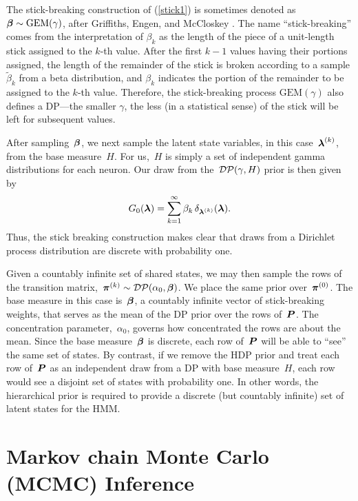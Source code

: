 The stick-breaking construction of (\ref{stick1}) is sometimes denoted
as~${\boldsymbol{\beta} \sim \mathrm{GEM}(\gamma)}$, after Griffiths, Engen, and
McCloskey \citep{Ewens90}.  The name ``stick-breaking'' comes from the
interpretation of $\beta_k$ as the length of the piece of a
unit-length stick assigned to the $k$-th value.  After the first $k-1$
values having their portions assigned, the length of the remainder of
the stick is broken according to a sample $\widetilde{\beta}_k$ from a beta
distribution, and ${\beta}_k$ indicates the portion of the
remainder to be assigned to the $k$-th value. Therefore, the
stick-breaking process $\mathrm{GEM}(\gamma)$ also defines a DP---the
smaller $\gamma$, the less (in a statistical sense) of the stick will
be left for subsequent values.

After sampling~$\boldsymbol{\beta}$, we next sample the latent state variables, in
this case~${\boldsymbol{\lambda}^{(k)}}$, from the base measure~$H$. For us,~$H$ is 
simply a set of independent gamma distributions for each neuron.
Our draw from
the~${\mathcal{DP}(\gamma,H)}$ prior is then given by
\begin{align*}
G_0(\boldsymbol{\lambda})=\sum_{k=1}^\infty \beta_k \, \delta_{\boldsymbol{\lambda}^{(k)}}(\boldsymbol{\lambda}).
\end{align*}
Thus, the stick breaking construction makes clear that draws from a
Dirichlet process distribution are discrete with probability one.

Given a countably infinite set of shared states, we may then sample
the rows of the transition
matrix,~${\boldsymbol{\pi}^{(k)}\sim\mathcal{DP}(\alpha_0,\boldsymbol{\beta})}$. We place the
same prior over~$\boldsymbol{\pi}^{(0)}$.  The base measure in this case is~$\boldsymbol{\beta}$, a
countably infinite vector of stick-breaking weights, that serves as
the mean of the DP prior over the rows of~$\boldsymbol{P}$. The concentration
parameter,~$\alpha_0$, governs how concentrated the rows are about the
mean. Since the base measure~$\boldsymbol{\beta}$ is discrete, each row of~$\boldsymbol{P}$
will be able to ``see'' the same set of states. By contrast, if we
remove the HDP prior and treat each row of~$\boldsymbol{P}$ as an independent draw
from a DP with base measure~$H$, each row would see a disjoint set of
states with probability one. In other words, the hierarchical prior is
required to provide a discrete (but countably infinite) set of latent
states for the HMM.

\section{Markov chain Monte Carlo (MCMC) Inference}


